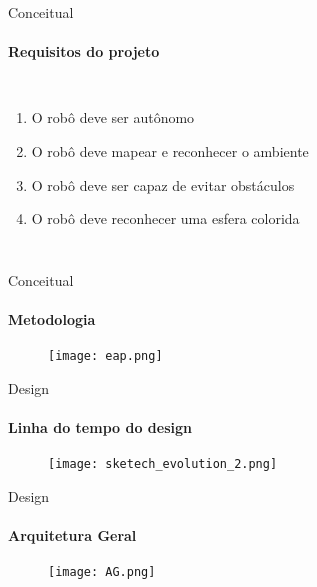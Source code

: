 \begin{frame}[t]{Conceitual} 
    \framesubtitle{Requisitos do projeto}
        \begin{columns}[t]
                \begin{enumerate}
                    \item O robô deve ser autônomo
                    \item O robô deve mapear e reconhecer o ambiente
                    \item O robô deve ser capaz de evitar obstáculos
                    \item O robô deve reconhecer uma esfera colorida
                \end{enumerate}
            \begin{center}
                \begin{figure}
                \end{figure}
            \end{center}
        \end{columns}
\end{frame}
\begin{frame}[t]{Conceitual}
    \framesubtitle{Metodologia}
    \begin{figure}
        \texttt{[image: eap.png]}
    \end{figure}
\end{frame}
\begin{frame}[t]{Design}
    \framesubtitle{Linha do tempo do design}
    \begin{figure}
        \texttt{[image: sketech\_evolution\_2.png]}
    \end{figure}
\end{frame}

\begin{frame}[t]{Design}
    \framesubtitle{Arquitetura Geral}
    \begin{figure}
        \texttt{[image: AG.png]}
    \end{figure}
\end{frame}

